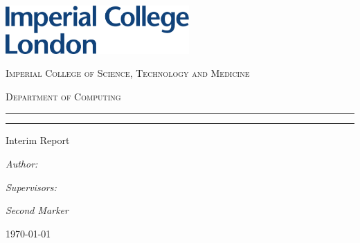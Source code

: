 \begin{titlepage}
	
	\noindent\includegraphics[width=7cm]{./figures/imperial}
	
	\Large\centering
	
	\vspace*{3\baselineskip}	
	\textsc{\LARGE \reporttype}
	
	\vspace*{\baselineskip}	
	\textsc{Imperial College of Science, Technology and Medicine}

	\vspace*{\baselineskip}	
	\textsc{Department of Computing}


	\setlength{\parindent}{0pt}
	
	\setlength{\parskip}{0pt}

	\rule{\linewidth}{0.4pt}\vspace*{\baselineskip}

	{\huge\bfseries\reporttitle}
	\rule{\linewidth}{0.4pt}

	Interim Report

	\begin{multicols}{2}
		\begin{flushleft}
			\emph{Author:}
			
			\reportauthor
		\end{flushleft}
		\columnbreak
		\begin{flushright}
			\emph{Supervisors:}
			
			\supervisor	
			\linespace
			\emph{Second Marker}
			
			\marker
		\end{flushright}			
	\end{multicols}
	
	
	\monthyeardate\today
	
	
\end{titlepage}
